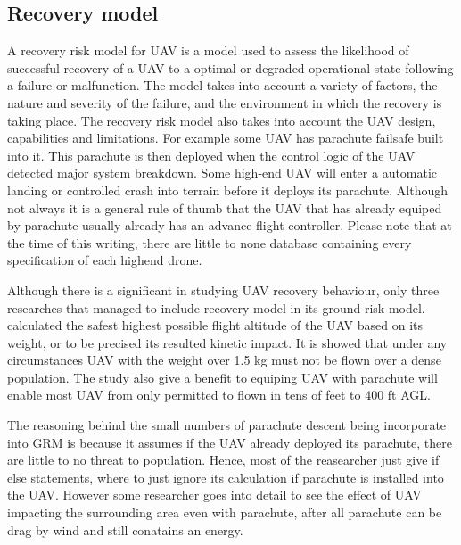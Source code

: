 \documentclass[12pt]{report}
\begin{document}
        \subsection{Recovery model}
            A recovery risk model for UAV is a model used to assess the likelihood of successful recovery of a UAV to a
            optimal or degraded operational state following a failure or malfunction. The model takes into account a
            variety of factors, the nature and severity of the failure, and the environment in which the recovery is
            taking place. The recovery risk model also takes into account the UAV design, capabilities and limitations.
            For example some UAV has parachute failsafe built into it. This parachute is then deployed when the control
            logic of the UAV detected major system breakdown. Some high-end UAV will enter a automatic landing or
            controlled crash into terrain before it deploys its parachute. Although not always it is a general rule of
            thumb that the UAV that has already equiped by parachute usually already has an advance flight controller.
            Please note that at the time of this writing, there are little to none database containing every specification
            of each highend drone.
                
            Although there is a significant in studying UAV recovery behaviour, only three researches that managed to
            include recovery model in its ground risk model. \cite{shelley_model_2016} calculated the safest highest
            possible flight altitude of the UAV based on its weight, or to be precised its resulted kinetic impact. It
            is showed that under any circumstances UAV with the weight over 1.5 kg must not be flown over a dense
            population. The study also give a benefit to equiping UAV with parachute will enable most UAV from only
            permitted to flown in tens of feet to 400 ft \ac{AGL}.

            The reasoning behind the small numbers of parachute descent being incorporate into GRM is because it assumes
            if the UAV already deployed its parachute, there are little to no threat to population. Hence, most of the
            reasearcher just give if else statements, where to just ignore its calculation if parachute is installed
            into the UAV. However some researcher goes into detail to see the effect of UAV impacting the surrounding
            area even with parachute, after all parachute can be drag by wind and still conatains an energy.
\end{document}
